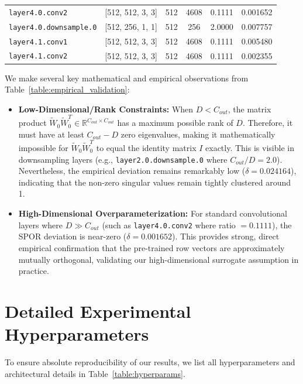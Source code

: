 \documentclass{article}
\theoremstyle{plain}
\theoremstyle{definition}
\theoremstyle{remark}
\begin{document}
\begin{table}[h]
\begin{center}
\begin{small}
\begin{tabular}{lccccc}
\texttt{layer4.0.conv2} & [512, 512, 3, 3] & 512 & 4608 & 0.1111 & 0.001652 \\
\texttt{layer4.0.downsample.0} & [512, 256, 1, 1] & 512 & 256 & 2.0000 & 0.007757 \\
\texttt{layer4.1.conv1} & [512, 512, 3, 3] & 512 & 4608 & 0.1111 & 0.005480 \\
\texttt{layer4.1.conv2} & [512, 512, 3, 3] & 512 & 4608 & 0.1111 & 0.002355 \\
\bottomrule
\end{tabular}
\end{small}
\end{center}
\vskip -0.1in
\end{table}

We make several key mathematical and empirical observations from Table~\ref{table:empirical_validation}:
\begin{itemize}
    \item \textbf{Low-Dimensional/Rank Constraints:} When $D < C_{out}$, the matrix product $\tilde{W}_0 \tilde{W}_0^T \in \mathbb{R}^{C_{out} \times C_{out}}$ has a maximum possible rank of $D$. Therefore, it must have at least $C_{out} - D$ zero eigenvalues, making it mathematically impossible for $\tilde{W}_0 \tilde{W}_0^T$ to equal the identity matrix $I$ exactly. This is visible in downsampling layers (e.g., \texttt{layer2.0.downsample.0} where $C_{out}/D = 2.0$). Nevertheless, the empirical deviation remains remarkably low ($\delta = 0.024164$), indicating that the non-zero singular values remain tightly clustered around 1.
    \item \textbf{High-Dimensional Overparameterization:} For standard convolutional layers where $D \gg C_{out}$ (such as \texttt{layer4.0.conv2} where ratio $= 0.1111$), the SPOR deviation is near-zero ($\delta = 0.001652$). This provides strong, direct empirical confirmation that the pre-trained row vectors are approximately mutually orthogonal, validating our high-dimensional surrogate assumption in practice.
\end{itemize}

\section{Detailed Experimental Hyperparameters}
\label{appendix:params}

To ensure absolute reproducibility of our results, we list all hyperparameters and architectural details in Table~\ref{table:hyperparams}.
\end{document}
